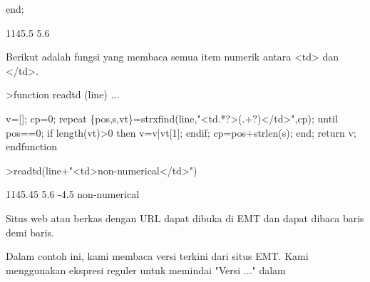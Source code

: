 \documentclass[a4paper,10pt]{article}
\begin{document}
\begin{eulernotebook}
\begin{eulercomment}
\begin{eulercomment}
\begin{eulercomment}
\begin{eulercomment}
\begin{eulercomment}
\begin{eulercomment}
\begin{eulercomment}
\begin{eulercomment}
\begin{eulercomment}
\begin{eulercomment}
\begin{eulercomment}
\begin{eulercomment}
\begin{eulercomment}
\begin{eulercomment}
\begin{eulercomment}
\begin{eulercomment}
\begin{eulercomment}
\begin{eulercomment}
\begin{eulercomment}
\begin{eulercomment}
\begin{eulercomment}
\begin{eulercomment}
\begin{eulercomment}
\begin{eulercomment}
\begin{eulercomment}
\begin{eulercomment}
\begin{eulercomment}
\begin{eulercomment}
\begin{eulercomment}
\begin{eulercomment}
\begin{eulercomment}
\begin{eulercomment}
\begin{eulercomment}
\begin{eulercomment}
\begin{eulercomment}
\begin{eulercomment}
\begin{eulercomment}
\begin{eulercomment}
\begin{eulercomment}
\begin{eulercomment}
\begin{eulercomment}
\begin{eulercomment}
\begin{eulercomment}
\begin{eulercomment}
\begin{eulercomment}
\begin{eulercomment}
\begin{eulercomment}
\begin{eulercomment}
\begin{eulercomment}
\begin{eulercomment}
\begin{eulercomment}
\begin{eulercomment}
\begin{eulercomment}
\begin{eulercomment}
\begin{eulercomment}
\begin{eulercomment}
\begin{eulercomment}
\begin{eulercomment}
\begin{eulercomment}
\begin{eulercomment}
\begin{eulercomment}
\begin{eulercomment}
\begin{eulercomment}
\begin{eulercomment}
\begin{eulercomment}
\begin{eulercomment}
\begin{eulercomment}
\begin{eulercomment}
\begin{eulercomment}
\begin{eulercomment}
\begin{eulerprompt}
end;
\end{eulerprompt}
\begin{euleroutput}
  1145.5
  5.6
\end{euleroutput}
\begin{eulercomment}
Berikut adalah fungsi yang membaca semua item numerik antara \textless{}td\textgreater{} dan
\textless{}/td\textgreater{}.
\end{eulercomment}
\begin{eulerprompt}
>function readtd (line) ...
\end{eulerprompt}
\begin{eulerudf}
  v=[]; cp=0;
  repeat
     \{pos,s,vt\}=strxfind(line,"<td.*?>(.+?)</td>",cp);
     until pos==0;
     if length(vt)>0 then v=v|vt[1]; endif;
     cp=pos+strlen(s);
  end;
  return v;
  endfunction
\end{eulerudf}
\begin{eulerprompt}
>readtd(line+"<td>non-numerical</td>")
\end{eulerprompt}
\begin{euleroutput}
  1145.45
  5.6
  -4.5
  non-numerical
\end{euleroutput}
\begin{eulercomment}
Situs web atau berkas dengan URL dapat dibuka di EMT dan dapat dibaca
baris demi baris.

Dalam contoh ini, kami membaca versi terkini dari situs EMT. Kami
menggunakan ekspresi reguler untuk memindai "Versi ..." dalam 
\end{eulercomment}
\end{eulercomment}
\end{eulercomment}
\end{eulercomment}
\end{eulercomment}
\end{eulercomment}
\end{eulercomment}
\end{eulercomment}
\end{eulercomment}
\end{eulercomment}
\end{eulercomment}
\end{eulercomment}
\end{eulercomment}
\end{eulercomment}
\end{eulercomment}
\end{eulercomment}
\end{eulercomment}
\end{eulercomment}
\end{eulercomment}
\end{eulercomment}
\end{eulercomment}
\end{eulercomment}
\end{eulercomment}
\end{eulercomment}
\end{eulercomment}
\end{eulercomment}
\end{eulercomment}
\end{eulercomment}
\end{eulercomment}
\end{eulercomment}
\end{eulercomment}
\end{eulercomment}
\end{eulercomment}
\end{eulercomment}
\end{eulercomment}
\end{eulercomment}
\end{eulercomment}
\end{eulercomment}
\end{eulercomment}
\end{eulercomment}
\end{eulercomment}
\end{eulercomment}
\end{eulercomment}
\end{eulercomment}
\end{eulercomment}
\end{eulercomment}
\end{eulercomment}
\end{eulercomment}
\end{eulercomment}
\end{eulercomment}
\end{eulercomment}
\end{eulercomment}
\end{eulercomment}
\end{eulercomment}
\end{eulercomment}
\end{eulercomment}
\end{eulercomment}
\end{eulercomment}
\end{eulercomment}
\end{eulercomment}
\end{eulercomment}
\end{eulercomment}
\end{eulercomment}
\end{eulercomment}
\end{eulercomment}
\end{eulercomment}
\end{eulercomment}
\end{eulercomment}
\end{eulercomment}
\end{eulercomment}
\end{eulercomment}
\end{eulernotebook}
\end{document}
